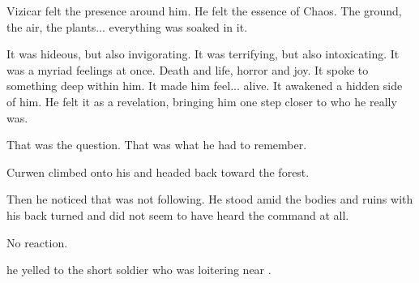 \begin{comment}
\section{Vizicar}
\end{comment}
\new
\begin{comment}
Carzain is spacing out. 
Curwen tells the others to go poke him. 
But Carzain doesn't hear. 
He hears Vizicar instead. 

Vizicar feels the \daemons. 
He feels the essence of Chaos. 
The ground, the air, the plants... everything is soaked in it. 
It is hideous, but also invigorating. 
It is a myriad feelings at once. 
Death and life, horror and joy. 
It spoke to something deep within him. 
It made him feel... alive. 
It awakened a hidden side of him. 
It was a revelation. 
It brought him one step closer to who he really was. 

\tho{Who am I?}
\end{comment}
Vizicar felt the \daemonic{} presence around him. 
He felt the essence of Chaos. 
The ground, the air, the plants... everything was soaked in it. 

It was hideous, but also invigorating. 
It was terrifying, but also intoxicating. 
It was a myriad feelings at once. 
Death and life, horror and joy. 
It spoke to something deep within him. 
It made him feel... alive. 
It awakened a hidden side of him. 
He felt it as a revelation, bringing him one step closer to who he really was. 


That was the question. 
That was what he had to remember. 






\new
Curwen climbed onto his \relc{} and headed back toward the forest. 

Then he noticed that \Shireyo{} was not following. 
He stood amid the bodies and ruins with his back turned and did not seem to have heard the command at all. 



No reaction. 

he yelled to the short  soldier who was loitering near \Shireyo. 

